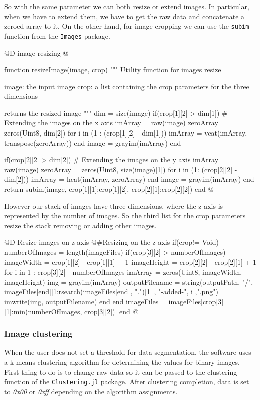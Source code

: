 \documentclass[11pt,oneside]{article}	%
\begin{document}
So with the same parameter we can both resize or extend images. In particular, when we have to extend them, we have to get the raw data and concatenate a zeroed array to it. On the other hand, for image cropping we can use the \texttt{subim} function from the \texttt{Images} package.

@D image resizing
@{function resizeImage(image, crop)
  """
  Utility function for images resize
  
  image: the input image
  crop: a list containing the crop parameters 
        for the three dimensions 
  
  returns the resized image
  """
  dim = size(image)
  if(crop[1][2] > dim[1])
    # Extending the images on the x axis
    imArray = raw(image)
    zeroArray = zeros(Uint8, dim[2])
    for i in (1 : (crop[1][2] - dim[1]))
      imArray = vcat(imArray, transpose(zeroArray))
    end
    image = grayim(imArray)
  end
  
  if(crop[2][2] > dim[2])
    # Extending the images on the y axis
    imArray = raw(image)
    zeroArray = zeros(Uint8, size(image)[1])
    for i in (1: (crop[2][2] - dim[2]))
      imArray = hcat(imArray, zeroArray)
    end
    image = grayim(imArray)
  end
  return subim(image, crop[1][1]:crop[1][2], crop[2][1]:crop[2][2])
end @}

However our stack of images have three dimensions, where the z-axis is represented by the number of images. So the third list for the crop parameters resize the stack removing or adding other images.

@D Resize images on z-axis
@{#Resizing on the z axis
if(crop!= Void)
  numberOfImages = length(imageFiles)
  if(crop[3][2] > numberOfImages)
    imageWidth = crop[1][2] - crop[1][1] + 1
    imageHeight = crop[2][2] - crop[2][1] + 1
    for i in 1 : crop[3][2] - numberOfImages
      imArray = zeros(Uint8, imageWidth, imageHeight)
      img = grayim(imArray)
      outputFilename = string(outputPath, "/", imageFiles[end][1:rsearch(imageFiles[end], ".")[1]],
			      "-added-", i ,".png")
      imwrite(img, outputFilename)
    end 
  end
  imageFiles = imageFiles[crop[3][1]:min(numberOfImages, crop[3][2])]
end @}

\subsubsection{Image clustering}\label{sec:imageClustering}

When the user does not set a threshold for data segmentation, the software uses a k-means clustering algorithm for determining the values for binary images. First thing to do is to change raw data so it can be passed to the clustering function of the \texttt{Clustering.jl} package. After clustering completion, data is set to \textit{0x00} or \textit{0xff} depending on the algorithm assignments.
\end{document}
